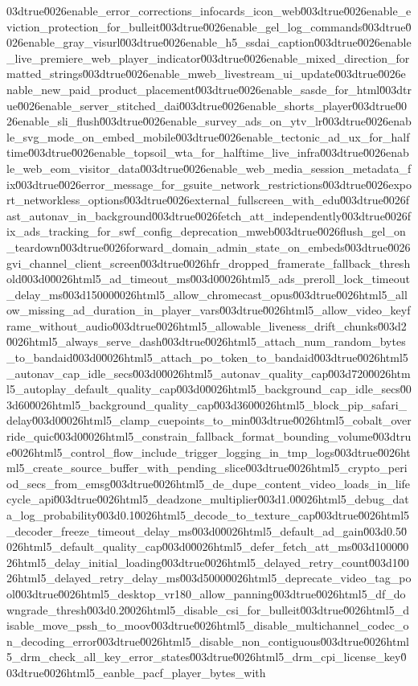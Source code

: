 {03dtrue\u0026enable_error_corrections_infocards_icon_web\u003dtrue\u0026enable_eviction_protection_for_bulleit\u003dtrue\u0026enable_gel_log_commands\u003dtrue\u0026enable_gray_visurl\u003dtrue\u0026enable_h5_ssdai_caption\u003dtrue\u0026enable_live_premiere_web_player_indicator\u003dtrue\u0026enable_mixed_direction_formatted_strings\u003dtrue\u0026enable_mweb_livestream_ui_update\u003dtrue\u0026enable_new_paid_product_placement\u003dtrue\u0026enable_sasde_for_html\u003dtrue\u0026enable_server_stitched_dai\u003dtrue\u0026enable_shorts_player\u003dtrue\u0026enable_sli_flush\u003dtrue\u0026enable_survey_ads_on_ytv_lr\u003dtrue\u0026enable_svg_mode_on_embed_mobile\u003dtrue\u0026enable_tectonic_ad_ux_for_halftime\u003dtrue\u0026enable_topsoil_wta_for_halftime_live_infra\u003dtrue\u0026enable_web_eom_visitor_data\u003dtrue\u0026enable_web_media_session_metadata_fix\u003dtrue\u0026error_message_for_gsuite_network_restrictions\u003dtrue\u0026export_networkless_options\u003dtrue\u0026external_fullscreen_with_edu\u003dtrue\u0026fast_autonav_in_background\u003dtrue\u0026fetch_att_independently\u003dtrue\u0026fix_ads_tracking_for_swf_config_deprecation_mweb\u003dtrue\u0026flush_gel_on_teardown\u003dtrue\u0026forward_domain_admin_state_on_embeds\u003dtrue\u0026gvi_channel_client_screen\u003dtrue\u0026hfr_dropped_framerate_fallback_threshold\u003d0\u0026html5_ad_timeout_ms\u003d0\u0026html5_ads_preroll_lock_timeout_delay_ms\u003d15000\u0026html5_allow_chromecast_opus\u003dtrue\u0026html5_allow_missing_ad_duration_in_player_vars\u003dtrue\u0026html5_allow_video_keyframe_without_audio\u003dtrue\u0026html5_allowable_liveness_drift_chunks\u003d2\u0026html5_always_serve_dash\u003dtrue\u0026html5_attach_num_random_bytes_to_bandaid\u003d0\u0026html5_attach_po_token_to_bandaid\u003dtrue\u0026html5_autonav_cap_idle_secs\u003d0\u0026html5_autonav_quality_cap\u003d720\u0026html5_autoplay_default_quality_cap\u003d0\u0026html5_background_cap_idle_secs\u003d60\u0026html5_background_quality_cap\u003d360\u0026html5_block_pip_safari_delay\u003d0\u0026html5_clamp_cuepoints_to_min\u003dtrue\u0026html5_cobalt_override_quic\u003d0\u0026html5_constrain_fallback_format_bounding_volume\u003dtrue\u0026html5_control_flow_include_trigger_logging_in_tmp_logs\u003dtrue\u0026html5_create_source_buffer_with_pending_slice\u003dtrue\u0026html5_crypto_period_secs_from_emsg\u003dtrue\u0026html5_de_dupe_content_video_loads_in_lifecycle_api\u003dtrue\u0026html5_deadzone_multiplier\u003d1.0\u0026html5_debug_data_log_probability\u003d0.1\u0026html5_decode_to_texture_cap\u003dtrue\u0026html5_decoder_freeze_timeout_delay_ms\u003d0\u0026html5_default_ad_gain\u003d0.5\u0026html5_default_quality_cap\u003d0\u0026html5_defer_fetch_att_ms\u003d1000\u0026html5_delay_initial_loading\u003dtrue\u0026html5_delayed_retry_count\u003d1\u0026html5_delayed_retry_delay_ms\u003d5000\u0026html5_deprecate_video_tag_pool\u003dtrue\u0026html5_desktop_vr180_allow_panning\u003dtrue\u0026html5_df_downgrade_thresh\u003d0.2\u0026html5_disable_csi_for_bulleit\u003dtrue\u0026html5_disable_move_pssh_to_moov\u003dtrue\u0026html5_disable_multichannel_codec_on_decoding_error\u003dtrue\u0026html5_disable_non_contiguous\u003dtrue\u0026html5_drm_check_all_key_error_states\u003dtrue\u0026html5_drm_cpi_license_key\u003dtrue\u0026html5_eanble_pacf_player_bytes_with}
